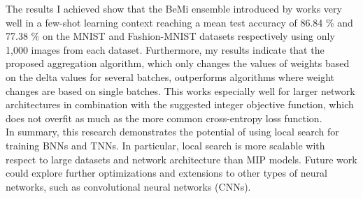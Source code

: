 \noindent The results I achieved show that the BeMi ensemble introduced by \citep{ambrogio2023} works very well in a few-shot learning context reaching a mean test accuracy of 86.84 \% and 77.38 \% on the MNIST and Fashion-MNIST datasets respectively using only 1,000 images from each dataset. Furthermore, my results indicate that the proposed aggregation algorithm, which only changes the values of weights based on the delta values for several batches, outperforms algorithms where weight changes are based on single batches. This works especially well for larger network architectures in combination with the suggested integer objective function, which does not overfit as much as the more common cross-entropy loss function. \\

\noindent In summary, this research demonstrates the potential of using local search for training BNNs and TNNs. In particular, local search is more scalable with respect to large datasets and network architecture than MIP models. Future work could explore further optimizations and extensions to other types of neural networks, such as convolutional neural networks (CNNs). 